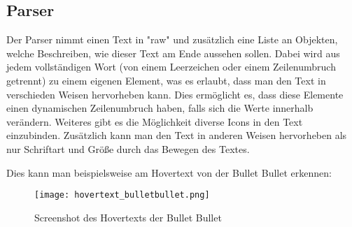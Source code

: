 
\renewcommand{\kapitelautor}{Autor: Felix Zwickelstorfer}
\subsection{Parser}\label{subsec:parser}
\renewcommand{\kapitelautor}{Autor: Felix Zwickelstorfer}

Der Parser nimmt einen Text in "raw" und zusätzlich eine Liste an Objekten, welche Beschreiben, wie dieser Text am Ende aussehen sollen.
Dabei wird aus jedem vollständigen Wort (von einem Leerzeichen oder einem Zeilenumbruch getrennt) zu einem eigenen Element, was es erlaubt, dass man den Text in verschieden Weisen hervorheben kann.
Dies ermöglicht es, dass diese Elemente einen dynamischen Zeilenumbruch haben, falls sich die Werte innerhalb verändern.
Weiteres gibt es die Möglichkeit diverse Icons in den Text einzubinden.
Zusätzlich kann man den Text in anderen Weisen hervorheben als nur Schriftart und Größe durch \zB das Bewegen des Textes.

Dies kann man beispielsweise am Hovertext von der Bullet Bullet erkennen:
\begin{figure}[H]
    \centering
    \texttt{[image: hovertext\_bulletbullet.png]}
    \caption{Screenshot des Hovertexts der Bullet Bullet}
\end{figure}


